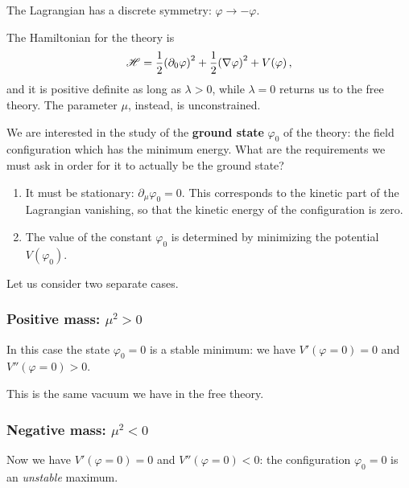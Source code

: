 \documentclass[main.tex]{subfiles}
\begin{document}
The Lagrangian has a discrete symmetry: \(\varphi \to -\varphi \). 

The Hamiltonian for the theory is 
%
\begin{align}
\mathscr{H} = \frac{1}{2} \qty(\partial_0 \varphi )^2 + \frac{1}{2} \qty(\nabla \varphi )^2 + V(\varphi )
\,,
\end{align}
%
and it is positive definite as long as \(\lambda > 0\), while \(\lambda = 0\) returns us to the free theory. The parameter \(\mu \), instead, is unconstrained.

We are interested in the study of the \textbf{ground state} \(\varphi_0 \) of the theory: the field configuration which has the minimum energy. 
What are the requirements we must ask in order for it to actually be the ground state? 

\begin{enumerate}
    \item It must be stationary: \(\partial_{\mu } \varphi_0 = 0\). This corresponds to the kinetic part of the Lagrangian vanishing, so that the kinetic energy of the configuration is zero. 
    \item The value of the constant \(\varphi_0 \) is determined by minimizing the potential \(V (\varphi_0 )\). 
\end{enumerate}


Let us consider two separate cases. 

\subsubsection{Positive mass: \(\mu^2> 0\)} 

In this case the state \(\varphi_0  = 0\) is a stable minimum: we have \(V' (\varphi  = 0) = 0\) and \(V'' (\varphi = 0) > 0\). 

This is the same vacuum we have in the free theory. 

\subsubsection{Negative mass: \(\mu^2 <0\)}

Now we have \(V'(\varphi =0) = 0\) and \(V'' (\varphi=0) < 0\): the configuration \(\varphi_0 = 0\) is an \emph{unstable} maximum. 
\end{document}
